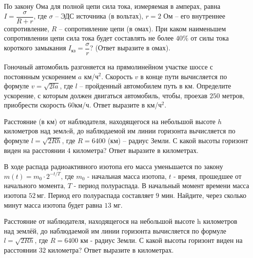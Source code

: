 \begin{class}[number=6]
\begin{listofex}
		\item По закону Ома для полной цепи сила тока, измеряемая в амперах, равна \( I=\dfrac{\sigma}{R+r} \), где \(\sigma\) – ЭДС источника (в вольтах), \(r=2\) Ом – его внутреннее сопротивление, \(R\) – сопротивление цепи (в омах). При каком наименьшем сопротивлении цепи сила тока будет составлять не более \(40\% \) от силы тока короткого замыкания \( I_{кз} =\dfrac{\sigma}{r}\)? (Ответ выразите в омах).
		\item Гоночный автомобиль разгоняется на прямолинейном участке шоссе с постоянным ускорением \( a \) км/ч\( ^2 \). Скорость \( v \)  в конце пути вычисляется по формуле \( v=\sqrt{2la} \), где \( l \) – пройденный автомобилем путь в км. Определите ускорение, с которым должен двигаться автомобиль, чтобы, проехав \( 250 \) метров, приобрести скорость \( 60 \)км/ч. Ответ выразите в км/ч\( ^2 \).
		\item Расстояние (в км) от наблюдателя, находящегося на небольшой высоте \( h \) километров над землeй, до наблюдаемой им линии горизонта вычисляется по формуле \( l=\sqrt{2Rh} \), где \( R = 6400 \) (км) – радиус Земли. С какой высоты горизонт виден на расстоянии \(4\) километра? Ответ выразите в километрах.
		\item В ходе распада радиоактивного изотопа его масса уменьшается по закону \( m(t)=m_0\cdot2^{-t/T} \), где \( m_0 \) - начальная масса изотопа,  \( t \) - время, прошедшее от начального момента, \( T \) - период полураспада. В начальный момент времени масса изотопа \( 52 \) мг. Период его полураспада составляет \( 9  \) мин. Найдите, через сколько минут масса изотопа будет равна \( 13  \) мг.
		\item Расстояние от наблюдателя, находящегося на небольшой высоте  h километров над землёй, до наблюдаемой им линии горизонта вычисляется по формуле \( l=\sqrt{2Rh} \), где \( R=6400 \) км - радиус Земли. С какой высоты горизонт виден на расстоянии \( 32 \) километра? Ответ выразите в километрах.
	\end{listofex}
\end{class}
\newpage
%
%
%	
